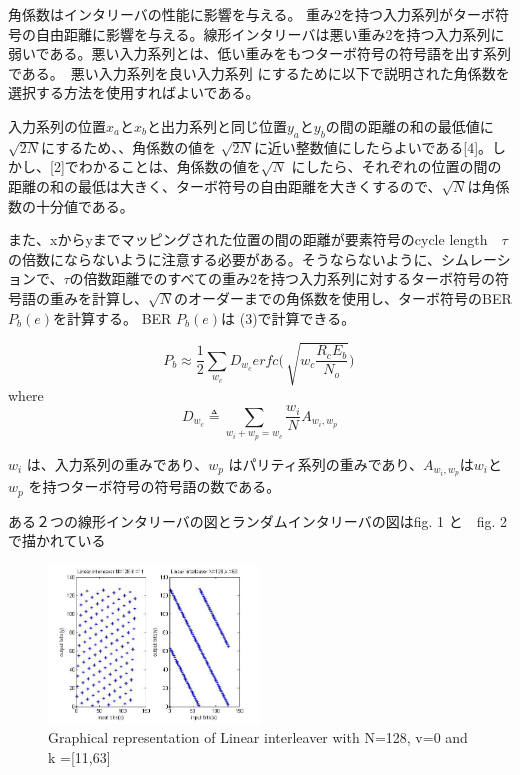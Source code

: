 \documentclass[20 pts]{article}
\begin{document}
角係数はインタリーバの性能に影響を与える。  重み2を持つ入力系列がターボ符号の自由距離に影響を与える。線形インタリーバは悪い重み2を持つ入力系列に弱いである。悪い入力系列とは、低い重みをもつターボ符号の符号語を出す系列である。　悪い入力系列を良い入力系列
にするために以下で説明された角係数を選択する方法を使用すればよいである。

 入力系列の位置$x_a$と$x_b$と出力系列と同じ位置$y_a$と$y_b$の間の距離の和の最低値に$\sqrt{2N}$にするため、、角係数の値を $\sqrt{2N}$に近い整数値にしたらよいである[4]。しかし、[2]でわかることは、角係数の値を$\sqrt{N}$ にしたら、それぞれの位置の間の距離の和の最低は大きく、ターボ符号の自由距離を大きくするので、$\sqrt{N}$は角係数の十分値である。
 
また、xからyまでマッピングされた位置の間の距離が要素符号のcycle length　$\tau$の倍数にならないように注意する必要がある。そうならないように、シムレーションで、$\tau$の倍数距離でのすべての重み2を持つ入力系列に対するターボ符号の符号語の重みを計算し、$\sqrt{N}$のオーダーまでの角係数を使用し、ターボ符号のBER $P_b(e)$を計算する。
BER $P_b(e)$は (3)で計算できる。



\begin{equation}
P_b \approx \frac{1}{2}\sum_{w_c}D_{w_c}erfc\Big (\, \sqrt{w_c \frac{R_cE_b}{N_o}} \Big)\,
\end{equation}
where
\begin{equation*}
D_{w_c} \triangleq \sum_{w_i+w_p=w_c}\frac{w_i}{N}A_{w_i,w_p}
\end{equation*}

$w_i$ は、入力系列の重みであり、$w_p$ はパリティ系列の重みであり、$A_{w_i,w_p}$は$w_i$と$w_p$ を持つターボ符号の符号語の数である。

ある２つの線形インタリーバの図とランダムインタリーバの図はfig. 1 と　fig. 2 で描かれている

\begin{figure}[!]
\centering
\includegraphics[width=0.5\textwidth,]{zemi2fig3.jpg}
\caption{Graphical representation of Linear interleaver with N=128, v=0 and k =[11,63]}
\label{}
\end{figure}
\end{document}

